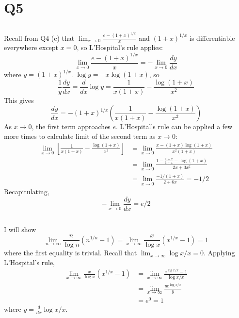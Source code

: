 \documentclass[12pt]{article}
\begin{document}
\section*{Q5}
\setcounter{subsection}{0}
\subsection{}
Recall from Q4 (c) that $\lim_{x \rightarrow 0} \frac{e - (1 + x)^{1/x}}{x}$ and $(1 + x)^{1/x}$ is differentiable everywhere except $x = 0$, so L'Hospital's rule applies:  
\begin{equation} \label{eq:5_res}
  \lim_{x \rightarrow 0} \frac{e - (1 + x)^{1/x}}{x} = - \lim_{x \rightarrow 0} \frac{dy}{dx}
\end{equation}
where $y = (1 + x)^{1/x}$. 
$\log y = -x \log(1 + x)$, so 
$$\frac{1}{y} \frac{dy}{dx} = \frac{d}{dx} \log y = \frac{1}{x(1 + x)} - \frac{\log(1 + x)}{x^2} $$
This gives 
$$\frac{dy}{dx} = -(1 + x)^{1/x} \left(\frac{1}{x(1 + x)} - \frac{\log(1 + x)}{x^2}\right)$$
As $x \rightarrow 0$, the first term approaches $e$. 
L'Hospital's rule can be applied a few more times to calculate limit of the second term as $x \rightarrow 0$: 
\begin{align*}
  \lim_{x \rightarrow 0} \left[ \frac{1}{x(1 + x)} - \frac{\log(1 + x)}{x^2} \right] 
  & = \lim_{x \rightarrow 0} \frac{x - (1 + x)\log(1 + x)}{x^2 (1 + x)} \\ 
  & = \lim_{x \rightarrow 0} \frac{1 - \frac{1 + x}{1 + x} - \log(1 + x)}{2x + 3x^2} \\ 
  & = \lim_{x \rightarrow 0} \frac{-1/(1 + x)}{2 + 6x} = -1/2
\end{align*}
Recapitulating, 
$$-\lim_{x \rightarrow 0} \frac{dy}{dx} = e / 2$$ 

\subsection{}
I will show 
$$\lim_{n \rightarrow \infty} \frac{n}{\log{n}} (n^{1/n} - 1) = \lim_{x \rightarrow \infty} \frac{x}{\log{x}}(x^{1/x} - 1) = 1$$ 
where the first equality is trivial. 
Recall that $\lim_{x \rightarrow \infty} \log{x}/x = 0$. 
Applying L'Hospital's rule, 
\begin{align*}
  \lim_{x \rightarrow \infty} \frac{x}{\log{x}}(x^{1/x} - 1) 
  & = \lim_{x \rightarrow \infty} \frac{e^{\log{x} / x} - 1}{\log{x} / x} \\ 
  & = \lim_{x \rightarrow \infty} \frac{y e^{\log{x} / x}}{y} \\ 
  & = e^0 = 1
\end{align*}
where $y = \frac{d}{dx} \log{x} / x$. 
\end{document}
